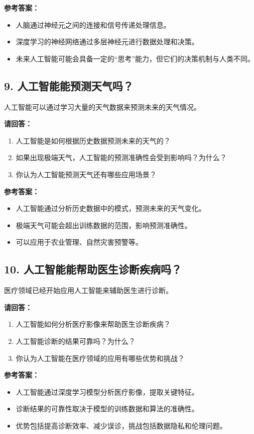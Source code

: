\textbf{参考答案：}
\begin{itemize}
    \item 人脑通过神经元之间的连接和信号传递处理信息。
    \item 深度学习的神经网络通过多层神经元进行数据处理和决策。
    \item 未来人工智能可能会具备一定的“思考”能力，但它们的决策机制与人类不同。
\end{itemize}

\subsection*{9. 人工智能能预测天气吗？}
人工智能可以通过学习大量的天气数据来预测未来的天气情况。

\textbf{请回答：}
\begin{enumerate}
    \item 人工智能是如何根据历史数据预测未来的天气的？
    \item 如果出现极端天气，人工智能的预测准确性会受到影响吗？为什么？
    \item 你认为人工智能预测天气还有哪些应用场景？
\end{enumerate}

\textbf{参考答案：}
\begin{itemize}
    \item 人工智能通过分析历史数据中的模式，预测未来的天气变化。
    \item 极端天气可能会超出训练数据的范围，影响预测准确性。
    \item 可以应用于农业管理、自然灾害预警等。
\end{itemize}

\subsection*{10. 人工智能能帮助医生诊断疾病吗？}
医疗领域已经开始应用人工智能来辅助医生进行诊断。

\textbf{请回答：}
\begin{enumerate}
    \item 人工智能如何分析医疗影像来帮助医生诊断疾病？
    \item 人工智能诊断的结果可靠吗？为什么？
    \item 你认为人工智能在医疗领域的应用有哪些优势和挑战？
\end{enumerate}

\textbf{参考答案：}
\begin{itemize}
    \item 人工智能通过深度学习模型分析医疗影像，提取关键特征。
    \item 诊断结果的可靠性取决于模型的训练数据和算法的准确性。
    \item 优势包括提高诊断效率、减少误诊，挑战包括数据隐私和伦理问题。
\end{itemize}
